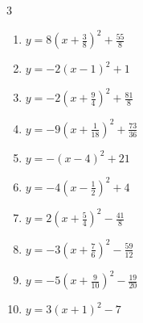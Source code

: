 \begin{multicols}{3}
\begin{enumerate}
  \item $\displaystyle y=8\left( x+\frac{3}{8}\right)^{2}+\frac{55}{8}$


  \item $\displaystyle y=-2\left( x-1\right)^{2}+1$

        \phantom{$\displaystyle 頂点\left( 1 , 1 \right)$}

  \item $\displaystyle y=-2\left( x+\frac{9}{4}\right)^{2}+\frac{81}{8}$


  \item $\displaystyle y=-9\left( x+\frac{1}{18}\right)^{2}+\frac{73}{36}$


  \item $\displaystyle y=-\left( x-4\right)^{2}+21$

        \phantom{$\displaystyle 頂点\left( 4 , 21 \right)$}

  \item $\displaystyle y=-4\left( x-\frac{1}{2}\right)^{2}+4$


  \item $\displaystyle y=2\left( x+\frac{5}{4}\right)^{2}-\frac{41}{8}$


  \item $\displaystyle y=-3\left( x+\frac{7}{6}\right)^{2}-\frac{59}{12}$


  \item $\displaystyle y=-5\left( x+\frac{9}{10}\right)^{2}-\frac{19}{20}$


  \item $\displaystyle y=3\left( x+1\right)^{2}-7$

        \phantom{$\displaystyle 頂点\left( -1 , -7 \right)$}


\end{enumerate}
\end{multicols}
